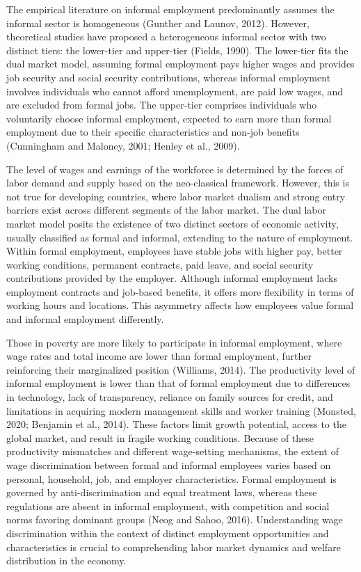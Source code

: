 The empirical literature on informal employment predominantly assumes the informal sector is homogeneous (Gunther and Launov, 2012). However, theoretical studies have proposed a heterogeneous informal sector with two distinct tiers: the lower-tier and upper-tier (Fields, 1990). The lower-tier fits the dual market model, assuming formal employment pays higher wages and provides job security and social security contributions, whereas informal employment involves individuals who cannot afford unemployment, are paid low wages, and are excluded from formal jobs. The upper-tier comprises individuals who voluntarily choose informal employment, expected to earn more than formal employment due to their specific characteristics and non-job benefits (Cunningham and Maloney, 2001; Henley et al., 2009).

The level of wages and earnings of the workforce is determined by the forces of labor demand and supply based on the neo-classical framework. However, this is not true for developing countries, where labor market dualism and strong entry barriers exist across different segments of the labor market. The dual labor market model posits the existence of two distinct sectors of economic activity, usually classified as formal and informal, extending to the nature of employment. Within formal employment, employees have stable jobs with higher pay, better working conditions, permanent contracts, paid leave, and social security contributions provided by the employer. Although informal employment lacks employment contracts and job-based benefits, it offers more flexibility in terms of working hours and locations. This asymmetry affects how employees value formal and informal employment differently.

Those in poverty are more likely to participate in informal employment, where wage rates and total income are lower than formal employment, further reinforcing their marginalized position (Williams, 2014). The productivity level of informal employment is lower than that of formal employment due to differences in technology, lack of transparency, reliance on family sources for credit, and limitations in acquiring modern management skills and worker training (Monsted, 2020; Benjamin et al., 2014). These factors limit growth potential, access to the global market, and result in fragile working conditions. Because of these productivity mismatches and different wage-setting mechanisms, the extent of wage discrimination between formal and informal employees varies based on personal, household, job, and employer characteristics. Formal employment is governed by anti-discrimination and equal treatment laws, whereas these regulations are absent in informal employment, with competition and social norms favoring dominant groups (Neog and Sahoo, 2016). Understanding wage discrimination within the context of distinct employment opportunities and characteristics is crucial to comprehending labor market dynamics and welfare distribution in the economy.

